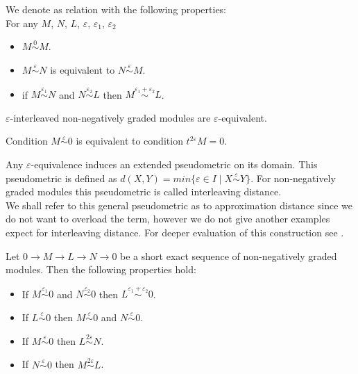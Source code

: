 \begin{definition}
  We denote as  relation with the following properties:\\
  For any $M$, $N$, $L$, $\varepsilon$, $\varepsilon_1$, $\varepsilon_2$
  \begin{itemize}
    \item $M \stackrel{0}{\sim} M$.
    \item $M \stackrel{\varepsilon}{\sim} N$ is equivalent to $N \stackrel{\varepsilon}{\sim} M$.
    \item if $M \stackrel{\varepsilon_1}{\sim} N$ and $N \stackrel{\varepsilon_2}{\sim} L$ then $M \stackrel{\varepsilon_1 + \varepsilon_2}{\sim} L$.
  \end{itemize}
\end{definition}

\begin{proposition}
  $\varepsilon$-interleaved non-negatively graded modules are $\varepsilon$-equivalent.
\end{proposition}

\begin{remark}
  \label{epstriv}
  Condition $M \stackrel{\varepsilon}{\sim} 0$ is equivalent to condition $t^{2\varepsilon}M = 0$. {\cite[Proposition 2.13]{GS16}}
\end{remark}

\begin{definition}
  Any $\varepsilon$-equivalence induces an extended pseudometric on its domain. This pseudometric is defined as $d(X,Y) = min\{\varepsilon \in I\;|\;X \stackrel{\varepsilon}{\sim} Y\}$. For non-negatively graded modules this pseudometric is called interleaving distance. {\cite[Definition 2.12]{GS16}}\\
  We shall refer to this general pseudometric as to approximation distance since we do not want to overload the term, however we do not give another examples expect for interleaving distance. For deeper evaluation of this construction see {\cite{deSilva18}}.
\end{definition}

\begin{lemma}
  \label{ops}
  Let $0 \to M \to L \to N \to 0$ be a short exact sequence of non-negatively graded modules. Then the following properties hold:
  \begin{itemize}
    \item If $M \stackrel{\varepsilon_1}{\sim} 0$ and $N \stackrel{\varepsilon_2}{\sim} 0$ then $L \stackrel{\varepsilon_1 + \varepsilon_2}{\sim} 0$. {\cite[Proposition 4.6]{GS16}}
    \item If $L \stackrel{\varepsilon}{\sim} 0$ then $M \stackrel{\varepsilon}{\sim} 0$ and $N \stackrel{\varepsilon}{\sim} 0$.
    \item If $M \stackrel{\varepsilon}{\sim} 0$ then $L \stackrel{2\varepsilon}{\sim} N$. {\cite[Proposition 4.1]{GS16}}
    \item If $N \stackrel{\varepsilon}{\sim} 0$ then $M \stackrel{2\varepsilon}{\sim} L$. {\cite[Proposition 4.1]{GS16}}
  \end{itemize}
\end{lemma}

